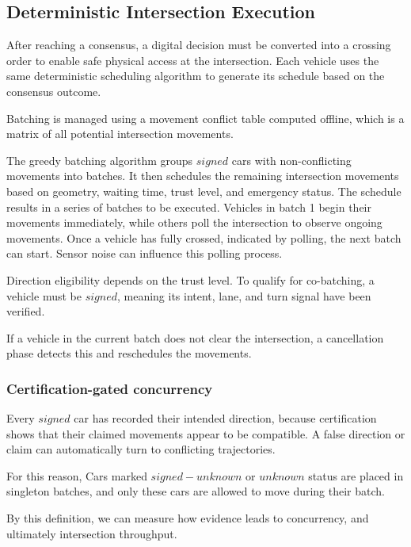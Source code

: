\documentclass[letterpaper,10pt,conference]{IEEEtran}
\begin{document}
\subsection{Deterministic Intersection Execution}
\label{sec:execution}

After reaching a consensus, a digital decision must be converted into a crossing order to enable safe physical access at the intersection. Each vehicle uses the same deterministic scheduling algorithm to generate its schedule based on the consensus outcome.

Batching is managed using a movement conflict table computed offline, which is a matrix of all potential intersection movements.

The greedy batching algorithm groups $signed$ cars with non-conflicting movements into batches. It then schedules the remaining intersection movements based on geometry, waiting time, trust level, and emergency status. The schedule results in a series of batches to be executed. Vehicles in batch 1 begin their movements immediately, while others poll the intersection to observe ongoing movements. Once a vehicle has fully crossed, indicated by polling, the next batch can start. Sensor noise can influence this polling process.

Direction eligibility depends on the trust level. To qualify for co-batching, a vehicle must be $signed$, meaning its intent, lane, and turn signal have been verified.

If a vehicle in the current batch does not clear the intersection, a cancellation phase detects this and reschedules the movements.  



\subsubsection{Certification-gated concurrency}

Every $signed$ car has recorded their intended direction, because certification shows that their claimed movements appear to be compatible. A false direction or claim can automatically turn to conflicting trajectories. 

For this reason, 
Cars marked $signed-unknown$ or $unknown$ status are placed in singleton batches, and only these cars are allowed to move during their batch.

By this definition, we can measure how  evidence leads to concurrency, and ultimately intersection throughput. 
\end{document}
